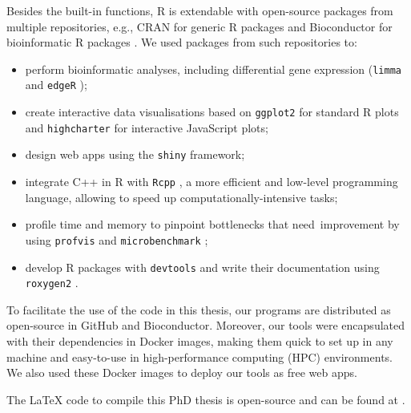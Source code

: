 Besides the built-in functions, R is extendable with open-source packages from multiple repositories, e.g., CRAN for generic R packages and Bioconductor for bioinformatic R packages \cite{huber:2015wt}. We used packages from such repositories to:

\begin{itemize}
	\item perform bioinformatic analyses, including differential gene expression (\texttt{limma} \cite{ritchie:2015tm} and \texttt{edgeR} \cite{robinson:2010wx});
	\item create interactive data visualisations based on \texttt{ggplot2} \cite{wickham:2016aa} for standard R plots and \texttt{highcharter} \cite{kunst:2022aa} for interactive JavaScript plots;
	\item design web apps using the \texttt{shiny} \cite{chang:2021ul} framework;
	\item integrate C++ in R with \texttt{Rcpp} \cite{eddelbuettel:2018aa}, a more efficient and low-level programming language, allowing to speed up computationally-intensive tasks;
	\item profile time and memory to pinpoint bottlenecks that need improvement by using \texttt{profvis} \cite{chang:2020aa} and \texttt{microbenchmark} \cite{mersmann:2021aa};
	\item develop R packages with \texttt{devtools} \cite{wickham:2021aa} and write their documentation using \texttt{roxygen2} \cite{wickham:2022aa}.
\end{itemize}

To facilitate the use of the code in this thesis, our programs are distributed as open-source in GitHub and Bioconductor. Moreover, our tools were encapsulated with their dependencies in Docker images, making them quick to set up in any machine and easy-to-use in high-performance computing (HPC) environments. We also used these Docker images to deploy our tools as free web apps.

The LaTeX code to compile this PhD thesis is open-source and can be found at .
